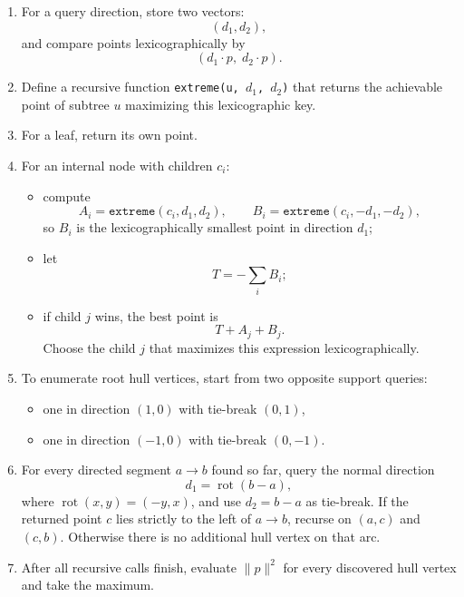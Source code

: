 \documentclass[11pt]{article}
\begin{document}
\begin{enumerate}[leftmargin=*]
    \item For a query direction, store two vectors:
    \[
        (d_1, d_2),
    \]
    and compare points lexicographically by
    \[
        (d_1 \cdot p,\; d_2 \cdot p).
    \]

    \item Define a recursive function \texttt{extreme(u, $d_1$, $d_2$)} that returns the achievable point of
    subtree $u$ maximizing this lexicographic key.

    \item For a leaf, return its own point.

    \item For an internal node with children $c_i$:
    \begin{itemize}[leftmargin=*]
        \item compute
        \[
            A_i = \texttt{extreme}(c_i, d_1, d_2),
            \qquad
            B_i = \texttt{extreme}(c_i, -d_1, -d_2),
        \]
        so $B_i$ is the lexicographically smallest point in direction $d_1$;
        \item let
        \[
            T = -\sum_i B_i;
        \]
        \item if child $j$ wins, the best point is
        \[
            T + A_j + B_j.
        \]
        Choose the child $j$ that maximizes this expression lexicographically.
    \end{itemize}

    \item To enumerate root hull vertices, start from two opposite support queries:
    \begin{itemize}[leftmargin=*]
        \item one in direction $(1,0)$ with tie-break $(0,1)$,
        \item one in direction $(-1,0)$ with tie-break $(0,-1)$.
    \end{itemize}

    \item For every directed segment $a \to b$ found so far, query the normal direction
    \[
        d_1 = \operatorname{rot}(b-a),
    \]
    where $\operatorname{rot}(x,y)=(-y,x)$, and use $d_2=b-a$ as tie-break.
    If the returned point $c$ lies strictly to the left of $a \to b$, recurse on $(a,c)$ and $(c,b)$.
    Otherwise there is no additional hull vertex on that arc.

    \item After all recursive calls finish, evaluate $\|p\|^2$ for every discovered hull vertex and take the
    maximum.
\end{enumerate}
\end{document}
